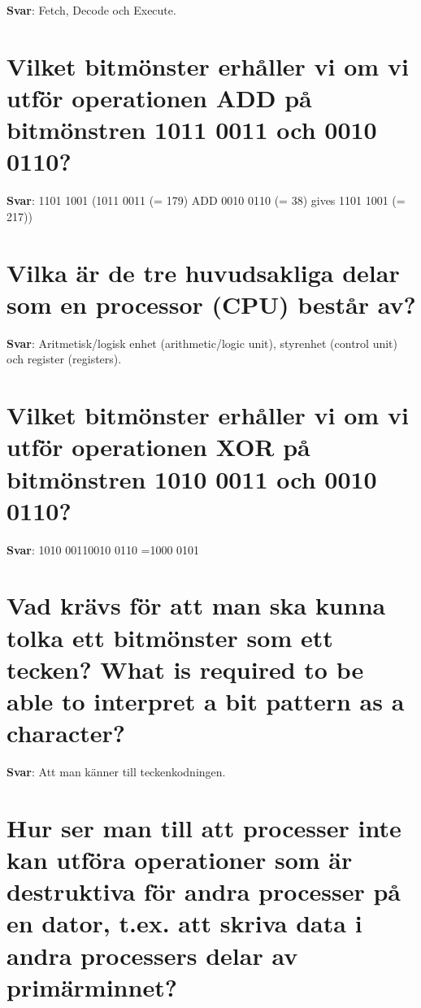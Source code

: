 \documentclass[a4paper,11pt,oneside]{book}
\begin{document}
\begin{sloppypar}
\label{q:98:sa:sv:True}

\textbf{Svar}: Fetch, Decode och Execute.



\section{Vilket bitm\"onster erh\r{a}ller vi om vi utf\"or operationen ADD p\r{a} bitm\"onstren 1011 0011 och 0010 0110?}

\label{q:99:sa:sv:True}

\textbf{Svar}: 1101 1001 (1011 0011 (= 179) ADD 0010 0110 (= 38) gives 1101 1001 (= 217))



\section{Vilka \"ar de tre huvudsakliga delar som en processor (CPU) best\r{a}r av?}

\label{q:100:sa:sv:True}

\textbf{Svar}: Aritmetisk/logisk enhet (arithmetic/logic unit), styrenhet (control unit) och register (registers).



\section{Vilket bitm\"onster erh\r{a}ller vi om vi utf\"or operationen XOR p\r{a} bitm\"onstren 1010 0011 och 0010 0110?}

\label{q:101:sa:sv:True}

\textbf{Svar}: 1010 00110010 0110 =1000 0101



\section{Vad kr\"avs f\"or att man ska kunna tolka ett bitm\"onster som ett tecken? What is required to be able to interpret a bit pattern as a character?}

\label{q:102:sa:sv:True}

\textbf{Svar}: Att man k\"anner till teckenkodningen.



\section{Hur ser man till att processer inte kan utf\"ora operationer som \"ar destruktiva f\"or andra processer p\r{a} en dator, t.ex. att skriva data i andra processers delar av prim\"arminnet?}


\end{sloppypar}
\end{document}
